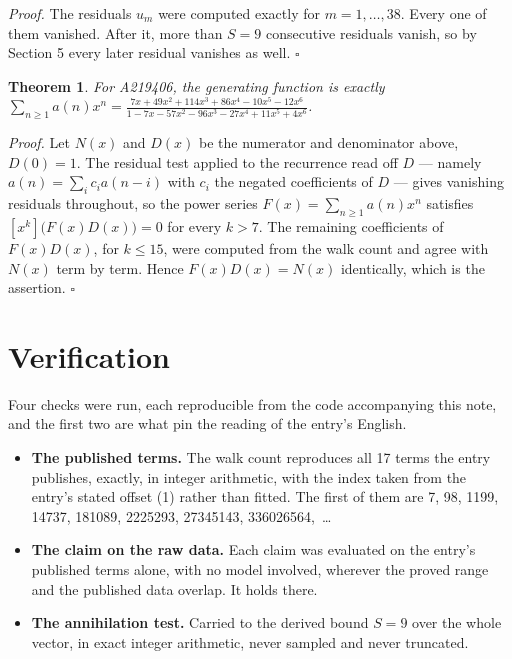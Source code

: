 \documentclass[11pt]{article}
\newtheorem{theorem}{Theorem}
\theoremstyle{definition}
\begin{document}
{\itshape Proof.} The residuals $u_m$ were computed exactly for $m = 1,\dots,38$. Every one of them vanished. After it, more than $S = 9$ consecutive residuals vanish, so by Section 5 every later residual vanishes as well. $\square$

\begin{theorem} For A219406, the generating function is exactly $\sum_{n\ge 1} a(n)x^n = \frac{7x + 49x^{2} + 114x^{3} + 86x^{4} - 10x^{5} - 12x^{6}}{1 - 7x - 57x^{2} - 96x^{3} - 27x^{4} + 11x^{5} + 4x^{6}}$.\end{theorem}

{\itshape Proof.} Let $N(x)$ and $D(x)$ be the numerator and denominator above, $D(0)=1$. The residual test applied to the recurrence read off $D$ --- namely $a(n) = \sum_i c_i a(n-i)$ with $c_i$ the negated coefficients of $D$ --- gives vanishing residuals throughout, so the power series $F(x)=\sum_{n\ge 1}a(n)x^n$ satisfies $[x^k]\bigl(F(x)D(x)\bigr) = 0$ for every $k > 7$. The remaining coefficients of $F(x)D(x)$, for $k \le 15$, were computed from the walk count and agree with $N(x)$ term by term. Hence $F(x)D(x) = N(x)$ identically, which is the assertion. $\square$

\section{Verification}

Four checks were run, each reproducible from the code accompanying this note, and the first two are what pin the reading of the entry's English.

\begin{itemize}

\item {\bfseries The published terms.} The walk count reproduces all 17 terms the entry publishes, exactly, in integer arithmetic, with the index taken from the entry's stated offset (1) rather than fitted. The first of them are 7, 98, 1199, 14737, 181089, 2225293, 27345143, 336026564,~\dots

\item {\bfseries The claim on the raw data.} Each claim was evaluated on the entry's published terms alone, with no model involved, wherever the proved range and the published data overlap. It holds there.

\item {\bfseries The annihilation test.} Carried to the derived bound $S = 9$ over the whole vector, in exact integer arithmetic, never sampled and never truncated.

\end{itemize}
\end{document}
